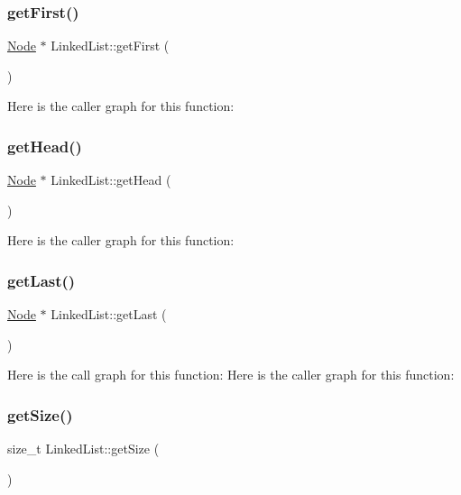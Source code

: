\subsubsection{\texorpdfstring{get\+First()}{getFirst()}}
{\footnotesize\ttfamily \hyperlink{class_node}{Node} $\ast$ Linked\+List\+::get\+First (\begin{DoxyParamCaption}{ }\end{DoxyParamCaption})\hspace{0.3cm}{\ttfamily [inline]}}

Here is the caller graph for this function\+:
\mbox{\label{class_linked_list_a1cba1fc059374f4d263bf5bece9fa136}} 
\subsubsection{\texorpdfstring{get\+Head()}{getHead()}}
{\footnotesize\ttfamily \hyperlink{class_node}{Node} $\ast$ Linked\+List\+::get\+Head (\begin{DoxyParamCaption}{ }\end{DoxyParamCaption})}

Here is the caller graph for this function\+:
\mbox{\label{class_linked_list_ad07d8659b87f77e9fb98a80eb71ed77a}} 
\subsubsection{\texorpdfstring{get\+Last()}{getLast()}}
{\footnotesize\ttfamily \hyperlink{class_node}{Node} $\ast$ Linked\+List\+::get\+Last (\begin{DoxyParamCaption}{ }\end{DoxyParamCaption})}

Here is the call graph for this function\+:
Here is the caller graph for this function\+:
\mbox{\label{class_linked_list_ac8d24166208694f4fe3cc982307b03fb}} 
\subsubsection{\texorpdfstring{get\+Size()}{getSize()}}
{\footnotesize\ttfamily size\+\_\+t Linked\+List\+::get\+Size (\begin{DoxyParamCaption}{ }\end{DoxyParamCaption})}

